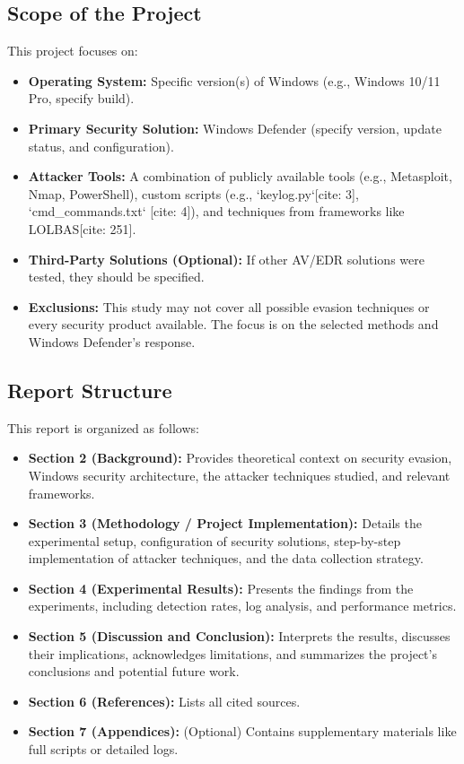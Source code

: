 \documentclass[11pt]{article}
\begin{document}
	\subsection{Scope of the Project}
	This project focuses on:
	\begin{itemize}
		\item \textbf{Operating System:} Specific version(s) of Windows (e.g., Windows 10/11 Pro, specify build).
		\item \textbf{Primary Security Solution:} Windows Defender (specify version, update status, and configuration).
		\item \textbf{Attacker Tools:} A combination of publicly available tools (e.g., Metasploit, Nmap, PowerShell), custom scripts (e.g., `keylog.py`[cite: 3], `cmd_commands.txt` [cite: 4]), and techniques from frameworks like LOLBAS[cite: 251].
		\item \textbf{Third-Party Solutions (Optional):} If other AV/EDR solutions were tested, they should be specified.
		\item \textbf{Exclusions:} This study may not cover all possible evasion techniques or every security product available. The focus is on the selected methods and Windows Defender's response.
	\end{itemize}
	
	\subsection{Report Structure}
	This report is organized as follows:
	\begin{itemize}
		\item \textbf{Section 2 (Background):} Provides theoretical context on security evasion, Windows security architecture, the attacker techniques studied, and relevant frameworks.
		\item \textbf{Section 3 (Methodology / Project Implementation):} Details the experimental setup, configuration of security solutions, step-by-step implementation of attacker techniques, and the data collection strategy.
		\item \textbf{Section 4 (Experimental Results):} Presents the findings from the experiments, including detection rates, log analysis, and performance metrics.
		\item \textbf{Section 5 (Discussion and Conclusion):} Interprets the results, discusses their implications, acknowledges limitations, and summarizes the project's conclusions and potential future work.
		\item \textbf{Section 6 (References):} Lists all cited sources.
		\item \textbf{Section 7 (Appendices):} (Optional) Contains supplementary materials like full scripts or detailed logs.
	\end{itemize}
	\newpage
	
\end{document}
